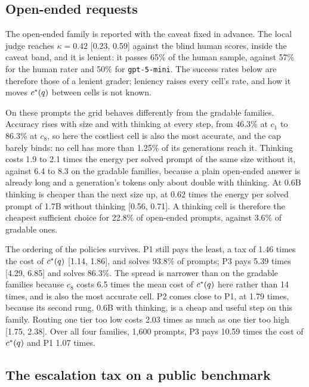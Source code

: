 \subsection{Open-ended requests}
\label{sec:results-open}

The open-ended family is reported with the caveat fixed in advance. The local
judge reaches $\kappa = 0.42$ [0.23, 0.59] against the blind human scores,
inside the caveat band, and it is lenient: it passes 65\% of the human
sample, against 57\% for the human rater and 50\% for
\texttt{gpt-5-mini}. The success rates below are therefore those of a lenient
grader; leniency raises every cell's rate, and how it moves $c^{*}(q)$
between cells is not known.

On these prompts the grid behaves differently from the gradable families.
Accuracy rises with size and with thinking at every step, from 46.3\% at
$c_1$ to 86.3\% at $c_8$, so here the costliest cell is also the most
accurate, and the cap barely binds: no cell has more than 1.25\% of its
generations reach it. Thinking costs 1.9 to 2.1 times the energy per solved
prompt of the same size without it, against 6.4 to 8.3 on the gradable
families, because a plain open-ended answer is already long and a
generation's tokens only about double with thinking. At 0.6B thinking is
cheaper than the next size up, at 0.62 times the energy per solved prompt of
1.7B without thinking [0.56, 0.71]. A thinking cell is therefore the cheapest
sufficient choice for 22.8\% of open-ended prompts, against 3.6\% of gradable
ones.

The ordering of the policies survives. P1 still pays the least, a tax of 1.46
times the cost of $c^{*}(q)$ [1.14, 1.86], and solves 93.8\% of prompts; P3
pays 5.39 times [4.29, 6.85] and solves 86.3\%. The spread is narrower than
on the gradable families because $c_8$ costs 6.5 times the mean cost of
$c^{*}(q)$ here rather than 14 times, and is also the most accurate cell. P2
comes close to P1, at 1.79 times, because its second rung, 0.6B with
thinking, is a cheap and useful step on this family. Routing one tier too low
costs 2.03 times as much as one tier too high [1.75, 2.38]. Over all four
families, 1{,}600 prompts, P3 pays 10.59 times the cost of $c^{*}(q)$ and P1
1.07 times.

\subsection{The escalation tax on a public benchmark}
\label{sec:results-public}

